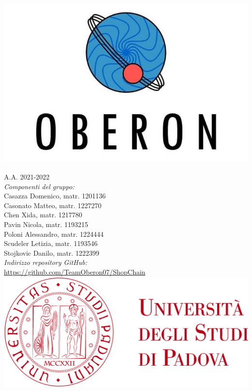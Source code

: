 \begin{titlepage}
	\begin{center}
		
		\includegraphics[scale = 0.2]{logo-cut.jpg}\\[1cm]
		\Huge \textsc{\doctitle{}}\\ [0.75cm]                          
		\Large \textsf{A.A. 2021-2022} \\ [1cm]

		\Large \textsl{Componenti del gruppo:} \\[0.25cm] \textsf{Casazza Domenico, matr. 1201136} \\ [0.1cm]
		\Large \textsf{Casonato Matteo, matr. 1227270} \\ [0.1cm]
		\Large \textsf{Chen Xida, matr. 1217780} \\ [0.1cm]
		\Large \textsf{Pavin Nicola, matr. 1193215} \\ [0.1cm]
		\Large \textsf{Poloni Alessandro, matr. 1224444} \\ [0.1cm]
		\Large \textsf{Scudeler Letizia, matr. 1193546} \\ [0.1cm]
		\Large \textsf{Stojkovic Danilo, matr. 1222399} \\ [1cm]
		                
		\Large \textsl{Indirizzo repository GitHub:} \\ \textsf{\href{https://github.com/TeamOberon07/ShopChain}{https://github.com/TeamOberon07/ShopChain}}\\[0.5cm]

		\includegraphics[scale = 0.055]{logo-unipd.png}

	\end{center}
\end{titlepage}